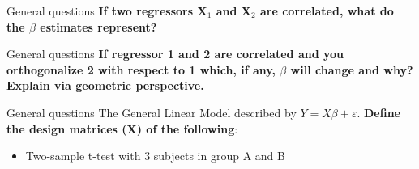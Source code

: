 \documentclass{beamer}
\begin{document}
\begin{frame}{General questions}
  \textbf{If two regressors X$_{1}$ and X$_{2}$ are correlated, what do the $\beta$ estimates represent?}

% 
\end{frame} 


\begin{frame}{General questions}
  \textbf{If regressor 1 and 2 are correlated and you orthogonalize 2 with respect to 1 which, if any, $\beta$ will change and why? Explain via geometric perspective.}

% 
\end{frame} 


\begin{frame}{General questions}  
  The General Linear Model described by $Y=X\beta+\varepsilon$. \textbf{Define the design matrices (X) of the following}:

  \begin{itemize}
    \item Two-sample t-test with 3 subjects in group A and B
  \end{itemize}

\end{frame}
\end{document}
